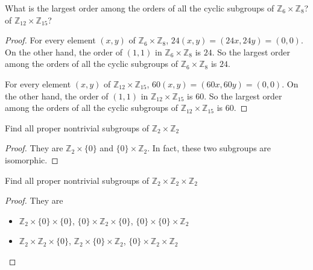 \newpage
\begin{exercise}
    What is the largest order among the orders of all the cyclic subgroups of $\mathbb{Z}_{6}\times\mathbb{Z}_{8}$? of $\mathbb{Z}_{12}\times\mathbb{Z}_{15}$?
\end{exercise}

\begin{proof}
    For every element $(x,y)$ of $\mathbb{Z}_{6}\times\mathbb{Z}_{8}$, $24(x,y) = (24x,24y) = (0,0)$. On the other hand, the order of $(1,1)$ in $\mathbb{Z}_{6}\times\mathbb{Z}_{8}$ is $24$. So the largest order among the orders of all the cyclic subgroups of $\mathbb{Z}_{6}\times\mathbb{Z}_{8}$ is $24$.

    For every element $(x,y)$ of $\mathbb{Z}_{12}\times\mathbb{Z}_{15}$, $60(x,y) = (60x,60y) = (0,0)$. On the other hand, the order of $(1,1)$ in $\mathbb{Z}_{12}\times\mathbb{Z}_{15}$ is $60$. So the largest order among the orders of all the cyclic subgroups of $\mathbb{Z}_{12}\times\mathbb{Z}_{15}$ is $60$.
\end{proof}

\newpage
\begin{exercise}
    Find all proper nontrivial subgroups of $\mathbb{Z}_{2}\times\mathbb{Z}_{2}$
\end{exercise}

\begin{proof}
    They are $\mathbb{Z}_{2}\times\{ 0 \}$ and $\{ 0 \}\times\mathbb{Z}_{2}$. In fact, these two subgroups are isomorphic.
\end{proof}

\newpage
\begin{exercise}
    Find all proper nontrivial subgroups of $\mathbb{Z}_{2}\times\mathbb{Z}_{2}\times\mathbb{Z}_{2}$
\end{exercise}

\begin{proof}
    They are
    \begin{itemize}
        \item $\mathbb{Z}_{2}\times\{0\}\times\{0\}$, $\{0\}\times\mathbb{Z}_{2}\times\{0\}$, $\{0\}\times\{0\}\times\mathbb{Z}_{2}$
        \item $\mathbb{Z}_{2}\times\mathbb{Z}_{2}\times\{0\}$, $\mathbb{Z}_{2}\times\{0\}\times\mathbb{Z}_{2}$, $\{0\}\times\mathbb{Z}_{2}\times\mathbb{Z}_{2}$
    \end{itemize}
\end{proof}

